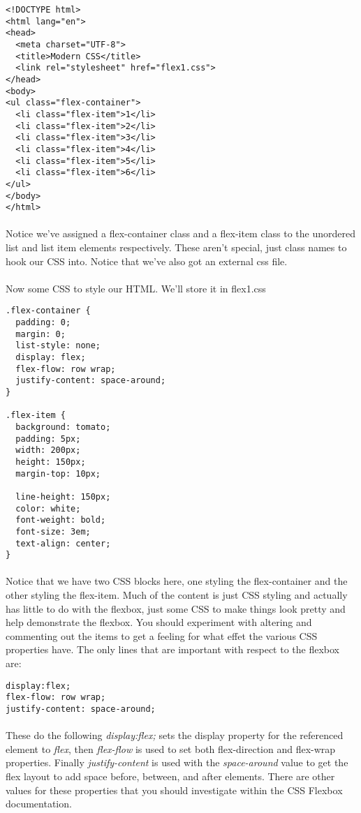 \documentclass[10pt, a4paper, twosize]{article}
\begin{document}
\begin{lstlisting}
<!DOCTYPE html>
<html lang="en">
<head>
  <meta charset="UTF-8">
  <title>Modern CSS</title>
  <link rel="stylesheet" href="flex1.css">
</head>
<body>
<ul class="flex-container">
  <li class="flex-item">1</li>
  <li class="flex-item">2</li>
  <li class="flex-item">3</li>
  <li class="flex-item">4</li>
  <li class="flex-item">5</li>
  <li class="flex-item">6</li>
</ul>
</body>
</html>
\end{lstlisting}
\paragraph{} Notice we've assigned a flex-container class and a flex-item class to the unordered list and list item elements respectively. These aren't special, just class names to hook our CSS into. Notice that we've also got an external css file.

\paragraph{} Now some CSS to style our HTML. We'll store it in flex1.css
\begin{lstlisting}
.flex-container {
  padding: 0;
  margin: 0;
  list-style: none;
  display: flex;
  flex-flow: row wrap;
  justify-content: space-around;
}

.flex-item {
  background: tomato;
  padding: 5px;
  width: 200px;
  height: 150px;
  margin-top: 10px;
  
  line-height: 150px;
  color: white;
  font-weight: bold;
  font-size: 3em;
  text-align: center;
}
\end{lstlisting}
\paragraph{} Notice that we have two CSS blocks here, one styling the flex-container and the other styling the flex-item. Much of the content is just CSS styling and actually has little to do with the flexbox, just some CSS to make things look pretty and help demonstrate the flexbox. You should experiment with altering and commenting out the items to get a feeling for what effet the various CSS properties have. The only lines that are important with respect to the flexbox are:

\begin{lstlisting}
display:flex;  
flex-flow: row wrap;
justify-content: space-around;
\end{lstlisting}
\paragraph{} These do the following \emph{display:flex;} sets the display property for the referenced element to \emph{flex}, then \emph{flex-flow} is used to set both flex-direction and flex-wrap properties. Finally \emph{justify-content} is used with the \emph{space-around} value to get the flex layout to add space before, between, and after elements. There are other values for these properties that you should investigate within the CSS Flexbox documentation.
\end{document}
